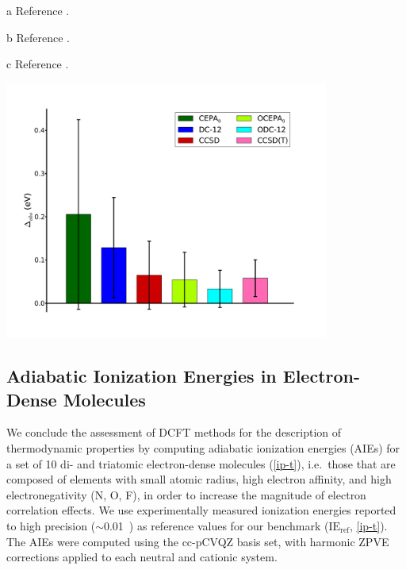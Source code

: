 {\begin{landscape}
\begin{threeparttable}
\begin{tablenotes}
                \item[a]
                    Reference .
                \item[b]
                    Reference .
                \item[c]
                    Reference .
            \end{tablenotes}
        \end{threeparttable}
        \vspace*{\fill}
    \end{landscape}
    \newpage
	\includegraphics[width=0.8\textwidth]{figures/ip.pdf}
}

\subsection{Adiabatic Ionization Energies in Electron-Dense Molecules}

We conclude the assessment of DCFT methods for the description of thermodynamic
properties by computing adiabatic ionization energies (AIEs) for a set of 10 di-
and triatomic electron-dense molecules (\cref{ip-t}), i.e.\ those that
are composed of elements with small atomic radius, high electron affinity, and
high electronegativity (N, O, F), in order to increase the magnitude of electron
correlation effects.
We use experimentally measured ionization energies reported to high precision
($\sim$0.01~\eV)\cite{Lias:1988p1,Trickl:1989p6006,Zhang:1994p377,Hansel:1998p1748}
as reference values for our benchmark (\(\mathrm{IE}_\mathrm{ref}\),
\cref{ip-t}).
The AIEs were computed using the cc-pCVQZ basis set, with harmonic ZPVE
corrections applied to each neutral and cationic system.

